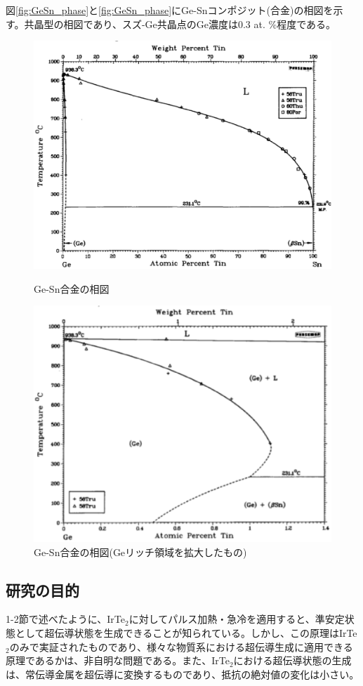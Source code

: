 図\ref{fig:GeSn_phase}と\ref{fig:GeSn_phase}にGe-Snコンポジット(合金)の相図を示す\cite{Olesinski1984}。共晶型の相図であり、スズ-Ge共晶点のGe濃度は0.3 at. \%程度である\cite{Olesinski1984,Thurmond1960}。
\begin{figure}[!h]
 \begin{minipage}{\hsize}
    \begin{center}
   \includegraphics[width=0.7\hsize]{Introduction/GeSn_phase.eps}
  \end{center}
  \caption{Ge-Sn合金の相図\cite{Olesinski1984}}
  \label{fig:GeSn_phase}
 \end{minipage}
 \begin{minipage}{\hsize}
    \begin{center}
   \includegraphics[width=0.7\hsize]{Introduction/GeSn_phase2.eps}
  \end{center}
  \caption{Ge-Sn合金の相図(Geリッチ領域を拡大したもの)\cite{Olesinski1984}}
  \label{fig:GeSn_phase2}
   \end{minipage}
\end{figure}

\subsection{研究の目的}
1-2節で述べたように、IrTe$_2$に対してパルス加熱・急冷を適用すると、準安定状態として超伝導状態を生成できることが知られている。しかし、この原理はIrTe$_2$のみで実証されたものであり、様々な物質系における超伝導生成に適用できる原理であるかは、非自明な問題である。また、IrTe$_2$における超伝導状態の生成は、常伝導金属を超伝導に変換するものであり、抵抗の絶対値の変化は小さい。


